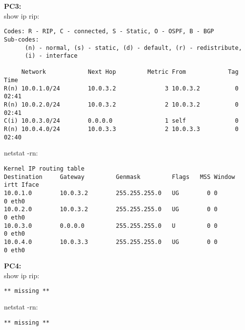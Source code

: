 \textbf{PC3:} \\
show ip rip:
\begin{lstlisting}
Codes: R - RIP, C - connected, S - Static, O - OSPF, B - BGP
Sub-codes:
      (n) - normal, (s) - static, (d) - default, (r) - redistribute,
      (i) - interface

     Network            Next Hop         Metric From            Tag Time
R(n) 10.0.1.0/24        10.0.3.2              3 10.0.3.2          0 02:41
R(n) 10.0.2.0/24        10.0.3.2              2 10.0.3.2          0 02:41
C(i) 10.0.3.0/24        0.0.0.0               1 self              0
R(n) 10.0.4.0/24        10.0.3.3              2 10.0.3.3          0 02:40
\end{lstlisting}
netstat -rn:
\begin{lstlisting}
Kernel IP routing table
Destination     Gateway         Genmask         Flags   MSS Window  irtt Iface
10.0.1.0        10.0.3.2        255.255.255.0   UG        0 0          0 eth0
10.0.2.0        10.0.3.2        255.255.255.0   UG        0 0          0 eth0
10.0.3.0        0.0.0.0         255.255.255.0   U         0 0          0 eth0
10.0.4.0        10.0.3.3        255.255.255.0   UG        0 0          0 eth0
\end{lstlisting}


\textbf{PC4:} \\
show ip rip:
\begin{lstlisting}
** missing **
\end{lstlisting}
netstat -rn:
\begin{lstlisting}
** missing **
\end{lstlisting}
